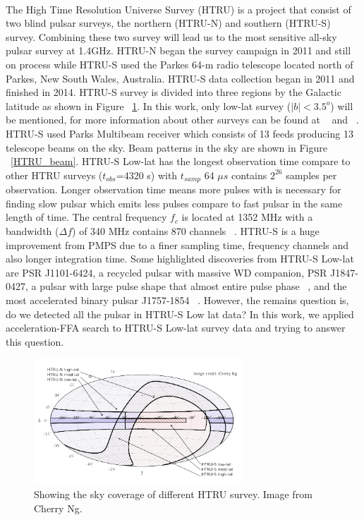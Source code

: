 \documentclass[thesis_msc.tex]{subfiles}
\begin{document}
		\paragraph{} The High Time Resolution Universe Survey (HTRU) is a project that consist of two blind pulsar surveys, the northern (HTRU-N) and southern (HTRU-S) survey. Combining these two survey will lead us to the most sensitive all-sky pulsar survey at 1.4GHz. HTRU-N began the survey campaign in 2011 and still on process while HTRU-S used the Parkes 64-m radio telescope located north of Parkes, New South Wales, Australia. HTRU-S data collection began in 2011 and finished in 2014. HTRU-S survey is divided into three regions by the Galactic latitude as shown in Figure ~\ref{HTRU_map}. In this work, only low-lat survey ($|b|<3.5^o$) will be mentioned, for more information about other surveys can be found at ~\cite{Andrew} and ~\cite{keith2010high}. HTRU-S used Parks Multibeam receiver which consists of 13 feeds producing 13 telescope beams on the sky. Beam patterns in the sky are shown in Figure ~\ref{HTRU_beam}. HTRU-S Low-lat has the longest observation time compare to other HTRU surveys ($t_{obs}$=4320 s) with $t_{samp}$ 64 $\mu s$ contains $2^{26}$ samples per observation. Longer observation time means more pulses with is necessary for finding slow pulsar which emits less pulses compare to fast pulsar in the same length of time. The central frequency $f_c$ is located at 1352 MHz with a bandwidth ($\Delta f$) of 340 MHz contains 870 channels ~\citep{keith2010high}. HTRU-S is a huge improvement from PMPS due to a finer sampling time, frequency channels and also longer integration time. Some highlighted discoveries from HTRU-S Low-lat are PSR J1101-6424, a recycled pulsar with massive WD companion, PSR J1847-0427, a pulsar with large pulse shape that almost entire pulse phase ~\citep{ng2015high}, and the most accelerated binary pulsar J1757-1854 ~\citep{cameron2018high}. However, the remains question is, do we detected all the pulsar in HTRU-S Low lat data? In this work, we applied acceleration-FFA search to HTRU-S Low-lat survey data and trying to answer this question. %
        
        \begin{figure}[h!] 
\centering
\includegraphics[width=0.7\textwidth]{figures/HTRU-sky-3regions.png}
\caption{Showing the sky coverage of different HTRU survey. Image from Cherry Ng.}
\label{HTRU_map}
\end{figure}
\end{document}
